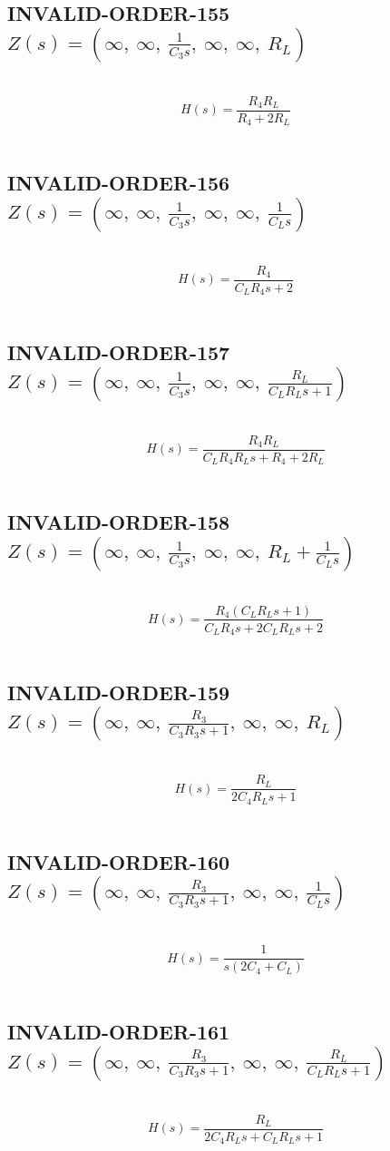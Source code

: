 \documentclass{article}
\begin{document}
\subsection{INVALID-ORDER-155 $Z(s) = \left( \infty, \  \infty, \  \frac{1}{C_{3} s}, \  \infty, \  \infty, \  R_{L}\right)$ } \ 
\textbf{\[H(s) = \frac{R_{4} R_{L}}{R_{4} + 2 R_{L}}\] } \ 
\subsection{INVALID-ORDER-156 $Z(s) = \left( \infty, \  \infty, \  \frac{1}{C_{3} s}, \  \infty, \  \infty, \  \frac{1}{C_{L} s}\right)$ } \ 
\textbf{\[H(s) = \frac{R_{4}}{C_{L} R_{4} s + 2}\] } \ 
\subsection{INVALID-ORDER-157 $Z(s) = \left( \infty, \  \infty, \  \frac{1}{C_{3} s}, \  \infty, \  \infty, \  \frac{R_{L}}{C_{L} R_{L} s + 1}\right)$ } \ 
\textbf{\[H(s) = \frac{R_{4} R_{L}}{C_{L} R_{4} R_{L} s + R_{4} + 2 R_{L}}\] } \ 
\subsection{INVALID-ORDER-158 $Z(s) = \left( \infty, \  \infty, \  \frac{1}{C_{3} s}, \  \infty, \  \infty, \  R_{L} + \frac{1}{C_{L} s}\right)$ } \ 
\textbf{\[H(s) = \frac{R_{4} \left(C_{L} R_{L} s + 1\right)}{C_{L} R_{4} s + 2 C_{L} R_{L} s + 2}\] } \ 
\subsection{INVALID-ORDER-159 $Z(s) = \left( \infty, \  \infty, \  \frac{R_{3}}{C_{3} R_{3} s + 1}, \  \infty, \  \infty, \  R_{L}\right)$ } \ 
\textbf{\[H(s) = \frac{R_{L}}{2 C_{4} R_{L} s + 1}\] } \ 
\subsection{INVALID-ORDER-160 $Z(s) = \left( \infty, \  \infty, \  \frac{R_{3}}{C_{3} R_{3} s + 1}, \  \infty, \  \infty, \  \frac{1}{C_{L} s}\right)$ } \ 
\textbf{\[H(s) = \frac{1}{s \left(2 C_{4} + C_{L}\right)}\] } \ 
\subsection{INVALID-ORDER-161 $Z(s) = \left( \infty, \  \infty, \  \frac{R_{3}}{C_{3} R_{3} s + 1}, \  \infty, \  \infty, \  \frac{R_{L}}{C_{L} R_{L} s + 1}\right)$ } \ 
\textbf{\[H(s) = \frac{R_{L}}{2 C_{4} R_{L} s + C_{L} R_{L} s + 1}\] } \ 
\end{document}
